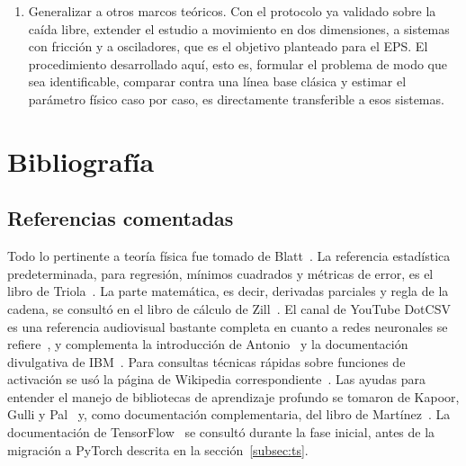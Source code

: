\documentclass[titlepage,11pt]{article}
\begin{document}
\begin{enumerate}
\item Generalizar a otros marcos teóricos. Con el protocolo ya validado
  sobre la caída libre, extender el estudio a movimiento en dos dimensiones, a
  sistemas con fricción y a osciladores, que es el objetivo planteado para el
  EPS. El procedimiento desarrollado aquí, esto es, formular el problema de modo
  que sea identificable, comparar contra una línea base clásica y estimar el
  parámetro físico caso por caso, es directamente transferible a esos sistemas.
\end{enumerate}


\section{Bibliografía}
\label{sec:biografia}

\subsection*{Referencias comentadas}
\label{sec:referencias}

Todo lo pertinente a teoría física fue tomado de Blatt~\cite{Fisica}. La
referencia estadística predeterminada, para regresión, mínimos cuadrados y
métricas de error, es el libro de Triola~\cite{triola_2018_estadstica}. La
parte matemática, es decir, derivadas parciales y regla de la cadena, se
consultó en el libro de cálculo de Zill~\cite{zill_1985_clculo}. El canal de
YouTube DotCSV es una referencia audiovisual bastante completa en cuanto a
redes neuronales se
refiere~\cite{santana_2018_1,santana_2018_2,santana_2018_3,santana_2018_3_5}, y
complementa la introducción de Antonio~\cite{antonio_2023_introduccin} y la
documentación divulgativa de IBM~\cite{ibm_qu}. Para consultas técnicas rápidas
sobre funciones de activación se usó la página de Wikipedia
correspondiente~\cite{wikipediacontributors_2018_activation}. Las ayudas para
entender el manejo de bibliotecas de aprendizaje profundo se tomaron de Kapoor,
Gulli y Pal~\cite{Amita} y, como documentación complementaria, del libro de
Martínez~\cite{Jesus}. La documentación de TensorFlow~\cite{TensorFlow} se
consultó durante la fase inicial, antes de la migración a PyTorch descrita en
la sección~\ref{subsec:ts}.



\end{document}
